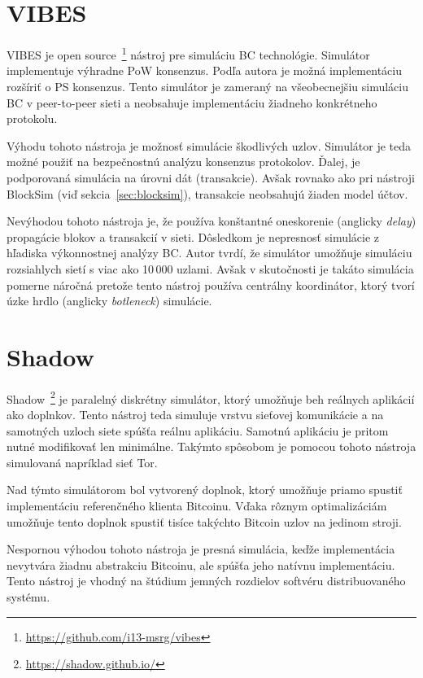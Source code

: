 \section{VIBES}

VIBES je open source~\footnote{\url{https://github.com/i13-msrg/vibes}} nástroj pre simuláciu BC technológie. Simulátor implementuje výhradne PoW konsenzus. Podľa autora je možná implementáciu rozšíriť o PS konsenzus. Tento simulátor je zameraný na všeobecnejšiu simuláciu BC v peer-to-peer sieti a neobsahuje implementáciu žiadneho konkrétneho protokolu.~\cite{vibesWp}

Výhodu tohoto nástroja je možnosť simulácie škodlivých uzlov. Simulátor je teda možné použiť na bezpečnostnú analýzu konsenzus protokolov. Ďalej, je podporovaná simulácia na úrovni dát (transakcie). Avšak rovnako ako pri nástroji BlockSim (viď sekcia~\ref{sec:blocksim}), transakcie neobsahujú žiaden model účtov.

Nevýhodou tohoto nástroja je, že používa konštantné oneskorenie (anglicky \textit{delay}) propagácie blokov a transakcií v sieti. Dôsledkom je nepresnosť simulácie z hľadiska výkonnostnej analýzy BC. Autor tvrdí, že simulátor umožňuje simuláciu rozsiahlych sietí s viac ako 10\,000 uzlami. Avšak v skutočnosti je takáto simulácia pomerne náročná pretože tento nástroj používa centrálny koordinátor, ktorý tvorí úzke hrdlo (anglicky \textit{botleneck}) simulácie.\cite{fanPerfEval}

\section{Shadow}

Shadow~\footnote{\url{https://shadow.github.io/}} je paralelný diskrétny simulátor, ktorý umožňuje beh reálnych aplikácií ako doplnkov. Tento nástroj teda simuluje vrstvu sieťovej komunikácie a na samotných uzloch siete spúšťa reálnu aplikáciu. Samotnú aplikáciu je pritom nutné modifikovať len minimálne. Takýmto spôsobom je pomocou tohoto nástroja simulovaná napríklad sieť Tor.~\cite{shadowTor}

Nad týmto simulátorom bol vytvorený doplnok, ktorý umožňuje priamo spustiť implementáciu referenčného klienta Bitcoinu. Vďaka rôznym optimalizáciám umožňuje tento doplnok spustiť tisíce takýchto Bitcoin uzlov na jedinom stroji.

Nespornou výhodou tohoto nástroja je presná simulácia, keďže implementácia nevytvára žiadnu abstrakciu Bitcoinu, ale spúšťa jeho natívnu implementáciu. Tento nástroj je vhodný na štúdium jemných rozdielov softvéru distribuovaného systému.


